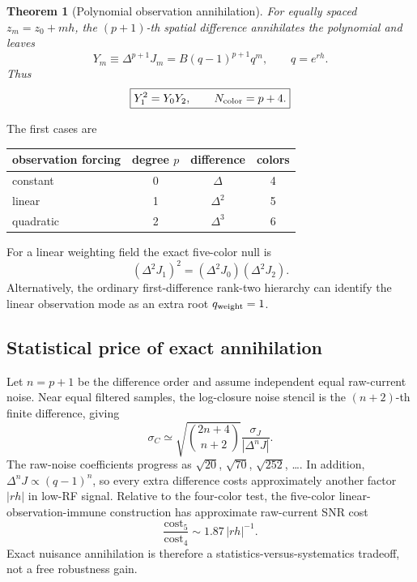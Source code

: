 \documentclass[11pt]{article}
\newtheorem{theorem}{Theorem}
\begin{document}
\begin{theorem}[Polynomial observation annihilation]
For equally spaced $z_m=z_0+mh$, the $(p+1)$-th spatial difference annihilates the polynomial and leaves
\begin{equation}
Y_m\equiv\Delta^{p+1}J_m=B(q-1)^{p+1}q^m,
\qquad q=e^{rh}.
\end{equation}
Thus
\begin{equation}
\boxed{Y_1^2=Y_0Y_2,\qquad N_{\rm color}=p+4.}
\end{equation}
\end{theorem}
The first cases are
\begin{center}
\begin{tabular}{lccc}
\toprule
observation forcing & degree $p$ & difference & colors \\
\midrule
constant & 0 & $\Delta$ & 4 \\
linear & 1 & $\Delta^2$ & 5 \\
quadratic & 2 & $\Delta^3$ & 6 \\
\bottomrule
\end{tabular}
\end{center}
For a linear weighting field the exact five-color null is
\begin{equation}
\boxed{(\Delta^2J_1)^2=(\Delta^2J_0)(\Delta^2J_2).}
\end{equation}
Alternatively, the ordinary first-difference rank-two hierarchy can identify the linear observation mode as an extra root $q_{\rm weight}=1$.

\subsection{Statistical price of exact annihilation}
Let $n=p+1$ be the difference order and assume independent equal raw-current noise. Near equal filtered samples, the log-closure noise stencil is the $(n+2)$-th finite difference, giving
\begin{equation}
\boxed{\sigma_C\simeq\sqrt{\binom{2n+4}{n+2}}\frac{\sigma_J}{|\Delta^nJ|}.}
\end{equation}
The raw-noise coefficients progress as $\sqrt{20}$, $\sqrt{70}$, $\sqrt{252}$, \ldots. In addition, $\Delta^nJ\propto(q-1)^n$, so every extra difference costs approximately another factor $|rh|$ in low-RF signal. Relative to the four-color test, the five-color linear-observation-immune construction has approximate raw-current SNR cost
\begin{equation}
\boxed{\frac{\mathrm{cost}_5}{\mathrm{cost}_4}\sim1.87\,|rh|^{-1}.}
\end{equation}
Exact nuisance annihilation is therefore a statistics-versus-systematics tradeoff, not a free robustness gain.
\end{document}
